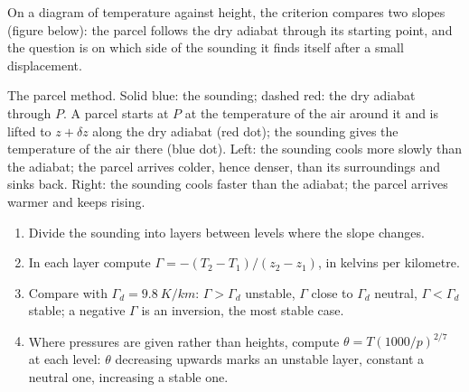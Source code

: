 On a diagram of temperature against height, the criterion compares two slopes
(figure below): the parcel follows the dry adiabat through its starting point,
and the question is on which side of the sounding it finds itself after a small
displacement.

\begin{omfigure}

{\small The parcel method. Solid blue: the sounding; dashed red: the dry
adiabat through $P$. A parcel starts at $P$ at the temperature of the air around
it and is lifted to $z + \delta z$ along the dry adiabat (red dot); the sounding
gives the temperature of the air there (blue dot). Left: the sounding
cools more slowly than the adiabat; the parcel arrives colder, hence denser, than
its surroundings and sinks back. Right: the sounding cools faster than the
adiabat; the parcel arrives warmer and keeps rising.}
\label{fig:b1:fluid-envelopes-structure:parcel}
\end{omfigure}

\begin{method}\label{met:b1:fluid-envelopes-structure:sounding}
\begin{enumerate}
  \item Divide the sounding into layers between levels where the slope changes.
  \item In each layer compute $\Gamma = -(T_2 - T_1)/(z_2 - z_1)$, in kelvins per
        kilometre.
  \item Compare with $\Gamma_d = \qty{9.8}{K/km}$: $\Gamma > \Gamma_d$ unstable,
        $\Gamma$ close to $\Gamma_d$ neutral, $\Gamma < \Gamma_d$ stable; a
        negative $\Gamma$ is an inversion, the most stable case.
  \item Where pressures are given rather than heights, compute $\theta =
        T(1000/p)^{2/7}$ at each level: $\theta$ decreasing upwards marks an
        unstable layer, constant a neutral one, increasing a stable one.
\end{enumerate}
\end{method}

